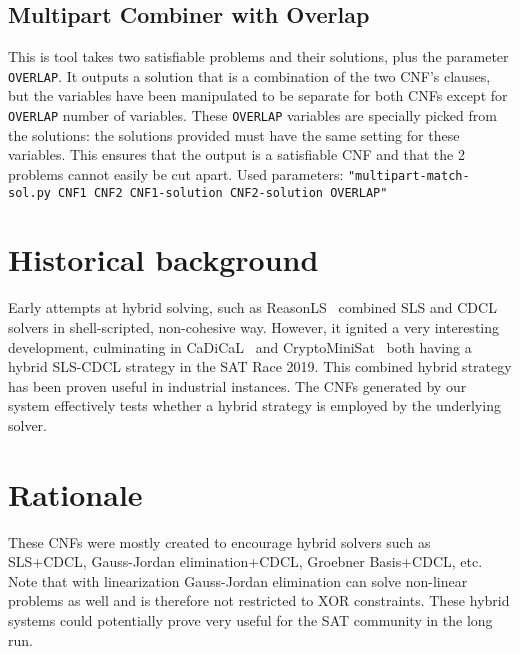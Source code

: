 \documentclass[final]{ieee}
\begin{document}
\subsection{Multipart Combiner with Overlap}
This is tool takes two satisfiable problems and their solutions, plus the parameter \texttt{OVERLAP}. It outputs a solution that is a combination of the two CNF's clauses, but the variables have been manipulated to be separate for both CNFs except for \texttt{OVERLAP} number of variables. These \texttt{OVERLAP} variables are specially picked from the solutions: the solutions provided must have the same setting for these variables. This ensures that the output is a satisfiable CNF and that the 2 problems cannot easily be cut apart. Used parameters: \texttt{"multipart-match-sol.py CNF1 CNF2 CNF1-solution CNF2-solution OVERLAP"}


\section{Historical background}
Early attempts at hybrid solving, such as ReasonLS~\cite{shaoweixindi} combined SLS and CDCL solvers in shell-scripted, non-cohesive way. However, it ignited a very interesting development, culminating in CaDiCaL~\cite{biere2018cadical} and CryptoMiniSat~\cite{CMS} both having a hybrid SLS-CDCL strategy in the SAT Race 2019. This combined hybrid strategy has been proven useful in industrial instances. The CNFs generated by our system effectively tests whether a hybrid strategy is employed by the underlying solver.

\section{Rationale}
These CNFs were mostly created to encourage hybrid solvers such as SLS+CDCL, Gauss-Jordan elimination+CDCL, Groebner Basis+CDCL, etc. Note that with linearization Gauss-Jordan elimination can solve non-linear problems as well and is therefore not restricted to XOR constraints. These hybrid systems could potentially prove very useful for the SAT community in the long run.




\vfill
\pagebreak
\end{document}
